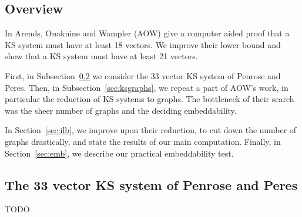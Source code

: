 \documentclass[a4paper]{article}
\newcounter{main}
\theoremstyle{definition}
\theoremstyle{remark}
\begin{document}
\subsection{Overview}
In \cite{aow11} Arends, Ouaknine and Wampler (AOW) give a computer aided proof
that a KS system must have at least 18 vectors.  We improve their lower bound
and show that a KS system must have at least 21 vectors.

First, in Subsection~\ref{sec:ks33} we consider the 33 vector KS system
of Penrose and Peres.  Then, in Subsection~\ref{sec:ksgraphs},
we repeat a part of AOW's work, in particular the reduction of
KS systems to graphs.
The bottleneck of their search was the sheer number of graphs
and the deciding embeddability.

In Section~\ref{sec:ilb},
we improve upon their reduction,
to cut down the number of graphs drastically,
and state the results of our main computation.
Finally, in Section~\ref{sec:emb},
we describe our practical embeddability test.

\subsection{The 33 vector KS system of Penrose and Peres}
\label{sec:ks33}
TODO
\end{document}

